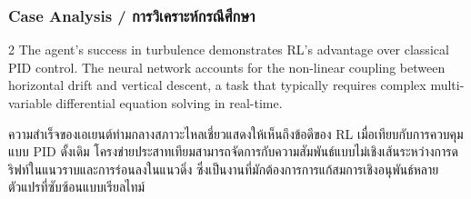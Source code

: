 \subsubsection*{Case Analysis \quad / \quad \textthai{การวิเคราะห์กรณีศึกษา}}
\begin{paracol}{2}
The agent's success in turbulence demonstrates RL's advantage over classical PID control. The neural network accounts for the non-linear coupling between horizontal drift and vertical descent, a task that typically requires complex multi-variable differential equation solving in real-time.

\switchcolumn

\begin{thai}
ความสำเร็จของเอเยนต์ท่ามกลางสภาวะไหลเชี่ยวแสดงให้เห็นถึงข้อดีของ RL เมื่อเทียบกับการควบคุมแบบ PID ดั้งเดิม โครงข่ายประสาทเทียมสามารถจัดการกับความสัมพันธ์แบบไม่เชิงเส้นระหว่างการดริฟท์ในแนวราบและการร่อนลงในแนวดิ่ง ซึ่งเป็นงานที่มักต้องการการแก้สมการเชิงอนุพันธ์หลายตัวแปรที่ซับซ้อนแบบเรียลไทม์
\end{thai}
\end{paracol}
